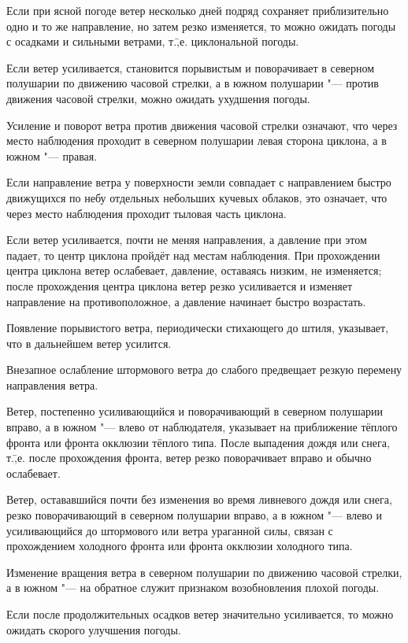  Если при ясной погоде ветер несколько дней подряд сохраняет
приблизительно одно и то же направление, но затем резко изменяется, то
можно ожидать погоды с осадками и сильными ветрами,
т.\=,е. циклональной погоды.

 Если ветер усиливается, становится порывистым и поворачивает в
северном полушарии по движению часовой стрелки, а в южном полушарии
"--- против движения часовой стрелки, можно ожидать ухудшения погоды.

 Усиление и поворот ветра против движения часовой стрелки
означают, что через место наблюдения проходит в северном полушарии
левая сторона циклона, а в южном "--- правая.

 Если направление ветра у поверхности земли совпадает с
направлением быстро движущихся по небу отдельных небольших кучевых
облаков, это означает, что через место наблюдения проходит тыловая
часть циклона.

 Если ветер усиливается, почти не меняя направления, а давление
при этом падает, то центр циклона пройдёт над местам наблюдения. При
прохождении центра циклона ветер ослабевает, давление, оставаясь
низким, не изменяется; после прохождения центра циклона ветер резко
усиливается и изменяет направление на противоположное, а давление
начинает быстро возрастать.

 Появление порывистого ветра, периодически стихающего до штиля,
указывает, что в дальнейшем ветер усилится.

 Внезапное ослабление штормового ветра до слабого предвещает
резкую перемену направления ветра.

 Ветер, постепенно усиливающийся и поворачивающий в северном
полушарии вправо, а в южном "--- влево от наблюдателя, указывает на
приближение тёплого фронта или фронта окклюзии тёплого типа. После
выпадения дождя или снега, т.\=,е. после прохождения фронта, ветер
резко поворачивает вправо и обычно ослабевает.

 Ветер, остававшийся почти без изменения во время ливневого
дождя или снега, резко поворачивающий в северном полушарии вправо, а
в южном "--- влево и усиливающийся до штормового или ветра ураганной
силы, связан с прохождением холодного фронта или фронта окклюзии
холодного типа.

 Изменение вращения ветра в северном полушарии по движению
часовой стрелки, а в южном "--- на обратное служит признаком возобновления
плохой погоды.

 Если после продолжительных осадков ветер значительно
усиливается, то можно ожидать скорого улучшения погоды.

